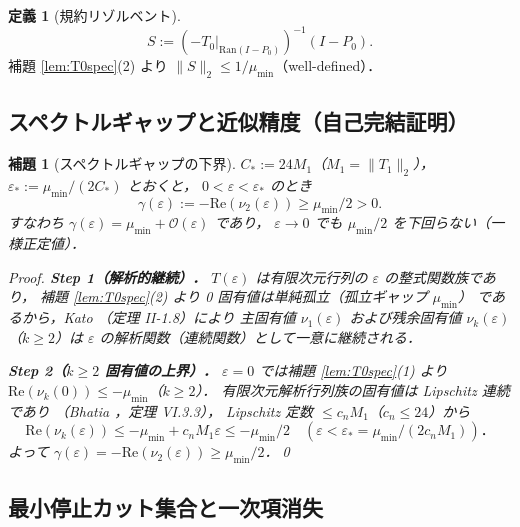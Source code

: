 \documentclass[12pt,a4paper]{article}
\theoremstyle{plain}
\newtheorem{lemma}[theorem]{補題}
\theoremstyle{definition}
\newtheorem{definition}[theorem]{定義}
\theoremstyle{remark}
\newcommand{\calO}{\mathcal{O}}
\newcommand{\eps}{\varepsilon}
\newcommand{\RedRes}{S}
\newcommand{\Proj}{P}
\begin{document}
\begin{definition}[規約リゾルベント]\label{def:riesz}
  \begin{equation}
    \RedRes := (-T_0|_{\mathrm{Ran}(I-\Proj_0)})^{-1}(I-\Proj_0).
  \end{equation}
  補題 \ref{lem:T0spec}(2) より $\|\RedRes\|_2 \le 1/\mu_{\min}$（well-defined）．
\end{definition}

\subsection{スペクトルギャップと近似精度（自己完結証明）}

\begin{lemma}[スペクトルギャップの下界]\label{lem:specgap}
  $C_*:= 24 M_1$（$M_1=\|T_1\|_2$），
  $\eps_* := \mu_{\min}/(2C_*)$ とおくと，
  $0<\eps<\eps_*$ のとき
  \begin{equation}\label{eq:specgap}
    \gamma(\eps) := -\mathrm{Re}(\nu_2(\eps)) \ge \mu_{\min}/2 > 0.
  \end{equation}
  すなわち $\gamma(\eps) = \mu_{\min}+\calO(\eps)$ であり，
  $\eps\to 0$ でも $\mu_{\min}/2$ を下回らない（一様正定値）．

  \begin{proof}
    \textbf{Step 1（解析的継続）．}
    $T(\eps)$ は有限次元行列の $\eps$ の整式関数族であり，
    補題 \ref{lem:T0spec}(2) より 0 固有値は単純孤立（孤立ギャップ $\mu_{\min}$）
    であるから，Kato \cite{kato1995}（定理 II-1.8）により
    主固有値 $\nu_1(\eps)$ および残余固有値 $\nu_k(\eps)$（$k\ge2$）は
    $\eps$ の解析関数（連続関数）として一意に継続される．

    \textbf{Step 2（$k\ge2$ 固有値の上界）．}
    $\eps=0$ では補題 \ref{lem:T0spec}(1) より
    $\mathrm{Re}(\nu_k(0))\le -\mu_{\min}$（$k\ge2$）．
    有限次元解析行列族の固有値は Lipschitz 連続であり
    （Bhatia \cite{bhatia1997}，定理 VI.3.3），
    Lipschitz 定数 $\le c_n M_1$（$c_n\le 24$）から
    \[
      \mathrm{Re}(\nu_k(\eps))
      \le -\mu_{\min} + c_n M_1 \eps
      \le -\mu_{\min}/2
      \quad(\eps<\eps_*=\mu_{\min}/(2c_nM_1))．
    \]
    よって $\gamma(\eps)=-\mathrm{Re}(\nu_2(\eps))\ge\mu_{\min}/2$．\qed
  \end{proof}
\end{lemma}

\subsection{最小停止カット集合と一次項消失}
\end{document}
